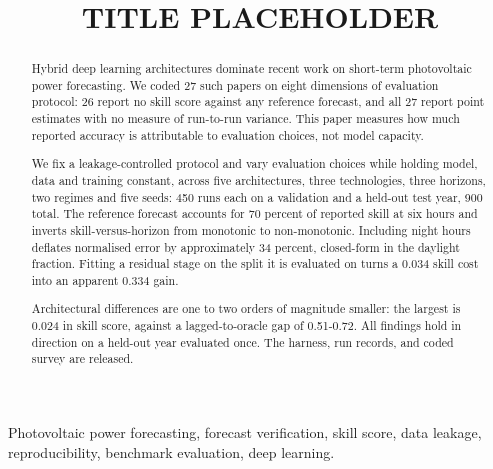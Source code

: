 \documentclass[conference]{IEEEtran}
\begin{document}
\title{TITLE PLACEHOLDER}

\author{
}

\maketitle

\begin{abstract}
Hybrid deep learning architectures dominate recent work on short-term
photovoltaic power forecasting. We coded 27 such papers on eight
dimensions of evaluation protocol: 26 report no skill score against
any reference forecast, and all 27 report point estimates with no
measure of run-to-run variance. This paper measures how much reported
accuracy is attributable to evaluation choices, not model capacity.

We fix a leakage-controlled protocol and vary evaluation choices while
holding model, data and training constant, across five architectures,
three technologies, three horizons, two regimes and five seeds: 450
runs each on a validation and a held-out test year, 900 total. The
reference forecast accounts for 70 percent of reported skill at six
hours and inverts skill-versus-horizon from monotonic to
non-monotonic. Including night hours deflates normalised error by
approximately 34 percent, closed-form in the daylight fraction. Fitting
a residual stage on the split it is evaluated on turns a 0.034 skill
cost into an apparent 0.334 gain.

Architectural differences are one to two orders of magnitude smaller:
the largest is 0.024 in skill score, against a lagged-to-oracle gap of
0.51-0.72. All findings hold in direction on a held-out year evaluated
once. The harness, run records, and coded survey are released.
\end{abstract}

\begin{IEEEkeywords}
Photovoltaic power forecasting, forecast verification, skill score,
data leakage, reproducibility, benchmark evaluation, deep learning.
\end{IEEEkeywords}












\end{document}
